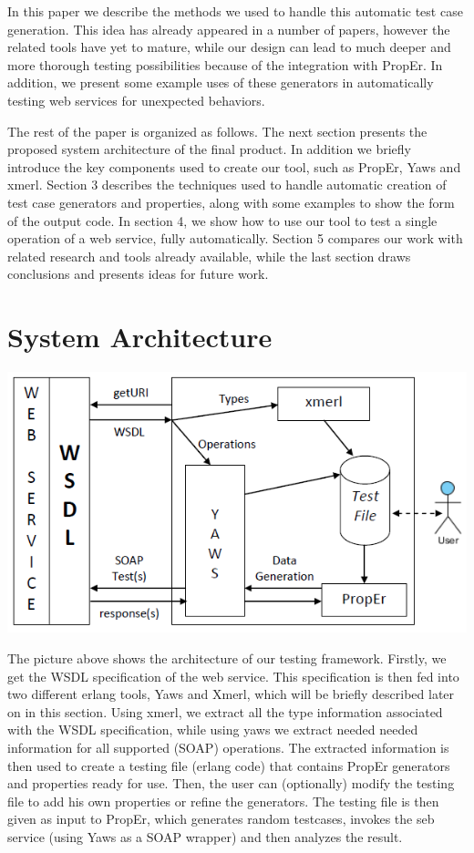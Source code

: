 \documentclass[submission,copyright,a4]{eptcs}
\begin{document}

In this paper we describe the methods we used to handle this automatic
test case generation. This idea has already appeared in a number of papers, 
however the related tools have yet to mature, while our design can lead to much 
deeper and more thorough testing possibilities because of the integration
with PropEr. In addition, we present some example uses of these generators 
in automatically testing web services for unexpected behaviors. 


The rest of the paper is organized as follows.
The next section presents the proposed system architecture of the final 
product. In addition we briefly introduce the key components used to 
create our tool, such as PropEr, Yaws and xmerl.
Section 3 describes the techniques used to handle automatic creation of
test case generators and properties, along with some examples to show 
the form of the output code. 
In section 4, we show how to use our tool to test a single operation of 
a web service, fully automatically.
Section 5 compares our work with related research and tools already 
available, while the last section draws conclusions and presents ideas 
for future work.

\section{System Architecture}

\includegraphics{PropErWebFramework.png}

The picture above shows the architecture of our testing framework. Firstly, we 
get the WSDL specification of the web service. This specification is then fed 
into two different erlang tools, Yaws and Xmerl, which will be briefly described 
later on in this section. Using xmerl, we extract all the type information 
associated with the WSDL specification, while using yaws we extract needed 
needed information for all supported (SOAP) operations. The extracted information 
is then used to create a testing file (erlang code) that contains PropEr generators 
and properties ready for use. Then, the user can (optionally) modify the testing 
file to add his own properties or refine the generators. The testing file is then 
given as input to PropEr, which generates random testcases, invokes the seb service 
(using Yaws as a SOAP wrapper) and then analyzes the result.
\end{document}
